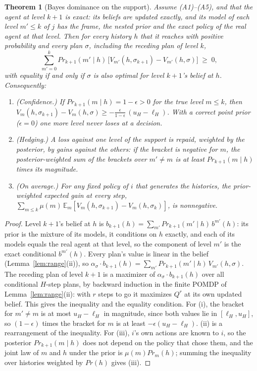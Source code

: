 \documentclass{article}
\renewcommand{\Pr}{\mathit{Pr}}
\newtheorem{theorem}{Theorem}
\begin{document}
\begin{theorem}[Bayes dominance on the support]
\label{thm:dominance}
Assume (A1)--(A5), and that the agent at level $k+1$ is exact: its beliefs are updated exactly, and its model of each level $m' \leq k$ of $j$ has the frame, the nested prior and the exact policy of the real agent at that level. Then for every history $h$ that it reaches with positive probability and every plan $\sigma$, including the receding plan of level $k$,
\[
\sum_{m' = 0}^{k} \Pr_{k+1}(m' \mid h)\, \big[V_{m'}(h, \sigma_{k+1}) - V_{m'}(h, \sigma)\big] \;\geq\; 0,
\]
with equality if and only if $\sigma$ is also optimal for level $k+1$'s belief at $h$. Consequently:
\begin{enumerate}
\item[(i)] \emph{(Confidence.)} If $\Pr_{k+1}(m \mid h) = 1 - \epsilon > 0$ for the true level $m \leq k$, then $V_m(h, \sigma_{k+1}) - V_m(h, \sigma) \geq -\frac{\epsilon}{1 - \epsilon}\,(u_H - \ell_H)$. With a correct point prior ($\epsilon = 0$) one more level never loses at a decision.
\item[(ii)] \emph{(Hedging.)} A loss against one level of the support is repaid, weighted by the posterior, by gains against the others: if the bracket is negative for $m$, the posterior-weighted sum of the brackets over $m' \neq m$ is at least $\Pr_{k+1}(m \mid h)$ times its magnitude.
\item[(iii)] \emph{(On average.)} For any fixed policy of $i$ that generates the histories, the prior-weighted expected gain at every step, $\sum_{m \leq k} \mu(m)\, \mathbb{E}_m[V_m(h, \sigma_{k+1}) - V_m(h, \sigma_k)]$, is nonnegative.
\end{enumerate}
\end{theorem}
\begin{proof}
Level $k+1$'s belief at $h$ is $b_{k+1}(h) = \sum_{m'} \Pr_{k+1}(m' \mid h)\, b^{m'}(h)$: its prior is the mixture of its models, it conditions on $h$ exactly, and each of its models equals the real agent at that level, so the component of level $m'$ is the exact conditional $b^{m'}(h)$. Every plan's value is linear in the belief (Lemma~\ref{lem:range}(ii)), so $\alpha_\sigma \cdot b_{k+1}(h) = \sum_{m'} \Pr_{k+1}(m' \mid h)\, V_{m'}(h, \sigma)$. The receding plan of level $k+1$ is a maximizer of $\alpha_\sigma \cdot b_{k+1}(h)$ over all conditional $H$-step plans, by backward induction in the finite POMDP of Lemma~\ref{lem:range}(ii): with $r$ steps to go it maximizes $Q^r$ at its own updated belief. This gives the inequality and the equality condition. For (i), the bracket for $m' \neq m$ is at most $u_H - \ell_H$ in magnitude, since both values lie in $[\ell_H, u_H]$, so $(1 - \epsilon)$ times the bracket for $m$ is at least $-\epsilon (u_H - \ell_H)$. (ii) is a rearrangement of the inequality. For (iii), $i$'s own actions are known to $i$, so the posterior $\Pr_{k+1}(m \mid h)$ does not depend on the policy that chose them, and the joint law of $m$ and $h$ under the prior is $\mu(m) \Pr_m(h)$; summing the inequality over histories weighted by $\Pr(h)$ gives (iii).
\end{proof}
\end{document}
